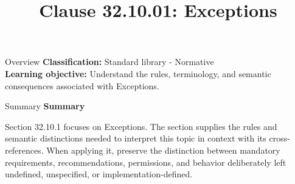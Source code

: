 \documentclass[10pt,letterpaper]{article}
\title{Clause 32.10.01: Exceptions}
\author{}
\date{}
\begin{document}
\maketitle
\begin{CornellOverviewBox}{Overview}
\textbf{Classification:} Standard library - Normative\\[2pt]
\textbf{Learning objective:} Understand the rules, terminology, and semantic consequences associated with Exceptions.
\end{CornellOverviewBox}\begin{CornellSummaryBox}{Summary}
{\sffamily\bfseries\color{Accent} Summary}\par\vspace{3pt}Section 32.10.1 focuses on Exceptions. The section supplies the rules and semantic distinctions needed to interpret this topic in context with its cross-references. When applying it, preserve the distinction between mandatory requirements, recommendations, permissions, and behavior deliberately left undefined, unspecified, or implementation-defined.
\end{CornellSummaryBox}
\end{document}
